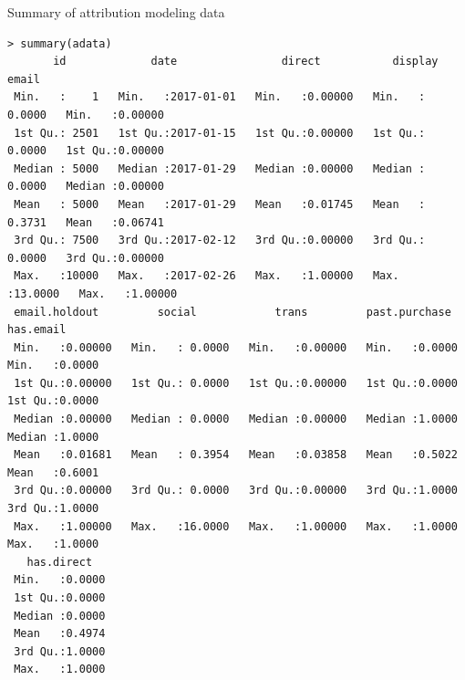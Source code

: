 \documentclass[10pt, aspectratio=169]{beamer}
\begin{document}
\begin{frame}[fragile]{Summary of attribution modeling data}
\footnotesize
\begin{lstlisting}[basicstyle=\tiny\ttfamily]
> summary(adata)
       id             date                direct           display            email        
 Min.   :    1   Min.   :2017-01-01   Min.   :0.00000   Min.   : 0.0000   Min.   :0.00000  
 1st Qu.: 2501   1st Qu.:2017-01-15   1st Qu.:0.00000   1st Qu.: 0.0000   1st Qu.:0.00000  
 Median : 5000   Median :2017-01-29   Median :0.00000   Median : 0.0000   Median :0.00000  
 Mean   : 5000   Mean   :2017-01-29   Mean   :0.01745   Mean   : 0.3731   Mean   :0.06741  
 3rd Qu.: 7500   3rd Qu.:2017-02-12   3rd Qu.:0.00000   3rd Qu.: 0.0000   3rd Qu.:0.00000  
 Max.   :10000   Max.   :2017-02-26   Max.   :1.00000   Max.   :13.0000   Max.   :1.00000  
 email.holdout         social            trans         past.purchase      has.email     
 Min.   :0.00000   Min.   : 0.0000   Min.   :0.00000   Min.   :0.0000   Min.   :0.0000  
 1st Qu.:0.00000   1st Qu.: 0.0000   1st Qu.:0.00000   1st Qu.:0.0000   1st Qu.:0.0000  
 Median :0.00000   Median : 0.0000   Median :0.00000   Median :1.0000   Median :1.0000  
 Mean   :0.01681   Mean   : 0.3954   Mean   :0.03858   Mean   :0.5022   Mean   :0.6001  
 3rd Qu.:0.00000   3rd Qu.: 0.0000   3rd Qu.:0.00000   3rd Qu.:1.0000   3rd Qu.:1.0000  
 Max.   :1.00000   Max.   :16.0000   Max.   :1.00000   Max.   :1.0000   Max.   :1.0000  
   has.direct    
 Min.   :0.0000  
 1st Qu.:0.0000  
 Median :0.0000  
 Mean   :0.4974  
 3rd Qu.:1.0000  
 Max.   :1.0000  
\end{lstlisting}
\end{frame}
\end{document}
